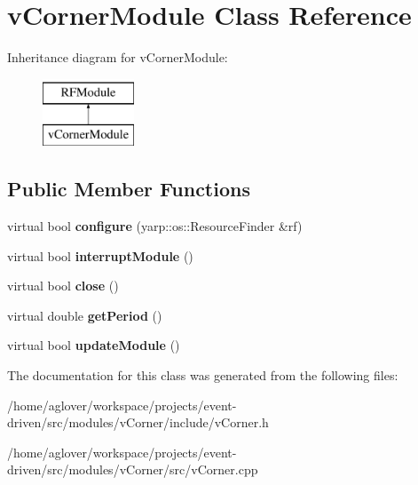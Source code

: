 \hypertarget{classvCornerModule}{}\section{v\+Corner\+Module Class Reference}
\label{classvCornerModule}
Inheritance diagram for v\+Corner\+Module\+:\begin{figure}[H]
\begin{center}
\leavevmode
\includegraphics[height=2.000000cm]{classvCornerModule}
\end{center}
\end{figure}
\subsection*{Public Member Functions}
\begin{DoxyCompactItemize}
\item 
virtual bool {\bfseries configure} (yarp\+::os\+::\+Resource\+Finder \&rf)\hypertarget{classvCornerModule_a9496d5d39d6b65dc048ce147ed2856d8}{}\label{classvCornerModule_a9496d5d39d6b65dc048ce147ed2856d8}

\item 
virtual bool {\bfseries interrupt\+Module} ()\hypertarget{classvCornerModule_a8354934bd0d851418e99d93c567f5020}{}\label{classvCornerModule_a8354934bd0d851418e99d93c567f5020}

\item 
virtual bool {\bfseries close} ()\hypertarget{classvCornerModule_aa66707b60e2f920a5faff5c13798b785}{}\label{classvCornerModule_aa66707b60e2f920a5faff5c13798b785}

\item 
virtual double {\bfseries get\+Period} ()\hypertarget{classvCornerModule_afc071a27e74fe3ab6d23a78b25844df4}{}\label{classvCornerModule_afc071a27e74fe3ab6d23a78b25844df4}

\item 
virtual bool {\bfseries update\+Module} ()\hypertarget{classvCornerModule_af25a4ba8a2b8346f0a3a69b6e80998c8}{}\label{classvCornerModule_af25a4ba8a2b8346f0a3a69b6e80998c8}

\end{DoxyCompactItemize}


The documentation for this class was generated from the following files\+:\begin{DoxyCompactItemize}
\item 
/home/aglover/workspace/projects/event-\/driven/src/modules/v\+Corner/include/v\+Corner.\+h\item 
/home/aglover/workspace/projects/event-\/driven/src/modules/v\+Corner/src/v\+Corner.\+cpp\end{DoxyCompactItemize}
